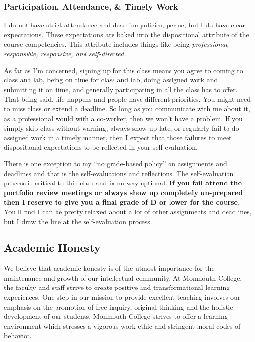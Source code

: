 \documentclass[10pt]{article}
\begin{document}
\subsubsection{Participation, Attendance, \& Timely Work}

I do not have strict attendance and deadline policies, per se, but I do have clear expectations. These
expectations are baked into the dispositional attribute of the course competencies. This attribute
includes things like being \textit{professional, responsible, responsive, and self-directed.}

As far as I'm concerned, signing up for this class means you agree to coming to class and lab,
being on time for class and lab, doing assigned work and submitting it on time, and generally participating
in all the class has to offer.  That being said, life happens and people have different priorities.
You might need to miss class or extend a deadline.  So long as you communicate with me about it, as a
professional would with a co-worker, then we won't have a problem. If you simply skip class without
warning, always show up late, or regularly fail to do assigned work in a timely manner, then I expect that
those failures to meet dispositional expectations to be reflected in your self-evaluation.

There is one exception to my ``no grade-based policy'' on assignments and deadlines and that is the
self-evaluations and reflections. The self-evaluation process is critical to this class and in no way
optional. \textbf{If you fail attend the portfolio review meetings or always show up completely un-prepared
then I reserve to give you a final grade of D or lower for the course.} You'll find I can be pretty relaxed
about a lot of other assignments and deadlines, but I draw the line at the self-evaluation process.


\subsection{Academic Honesty}

We believe that academic honesty is of the utmost importance for the maintenance and growth of our intellectual community. At Monmouth College, the faculty and staff strive to create positive and transformational learning experiences. One step in our mission to provide excellent teaching involves our emphasis on the promotion of free inquiry, original thinking and the holistic development of our students. Monmouth College strives to offer a learning environment which stresses a vigorous work ethic and stringent moral codes of behavior.
\end{document}
